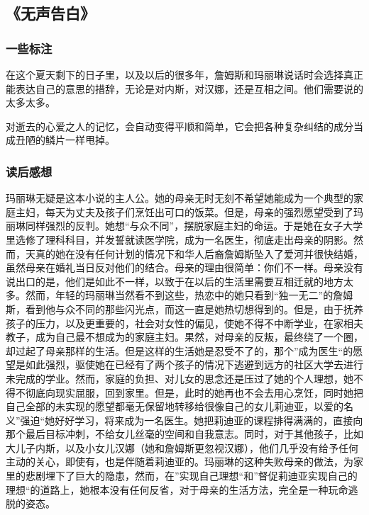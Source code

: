 \subsection{《无声告白》}

\subsubsection{一些标注}
在这个夏天剩下的日子里，以及以后的很多年，詹姆斯和玛丽琳说话时会选择真正能表达自己的意思的措辞，无论是对内斯，对汉娜，还是互相之间。他们需要说的太多太多。

对逝去的心爱之人的记忆，会自动变得平顺和简单，它会把各种复杂纠结的成分当成丑陋的鳞片一样甩掉。

\subsubsection{读后感想}
玛丽琳无疑是这本小说的主人公。她的母亲无时无刻不希望她能成为一个典型的家庭主妇，每天为丈夫及孩子们烹饪出可口的饭菜。但是，母亲的强烈愿望受到了玛丽琳同样强烈的反判。她想“与众不同”，摆脱家庭主妇的命运。于是她在女子大学里选修了理科科目，并发誓就读医学院，成为一名医生，彻底走出母亲的阴影。然而，天真的她在没有任何计划的情况下和华人后裔詹姆斯坠入了爱河并很快结婚，虽然母亲在婚礼当日反对他们的结合。母亲的理由很简单：你们不一样。母亲没有说出口的是，他们是如此不一样，以致于在以后的生活里需要互相迁就的地方太多。然而，年轻的玛丽琳当然看不到这些，热恋中的她只看到“独一无二”的詹姆斯，看到他与众不同的那些闪光点，而这一直是她热切想得到的。但是，由于抚养孩子的压力，以及更重要的，社会对女性的偏见，使她不得不中断学业，在家相夫教子，成为自己最不想成为的家庭主妇。果然，对母亲的反叛，最终绕了一个圈，却过起了母亲那样的生活。但是这样的生活她是忍受不了的，那个”成为医生“的愿望是如此强烈，驱使她在已经有了两个孩子的情况下逃避到远方的社区大学去进行未完成的学业。然而，家庭的负担、对儿女的思念还是压过了她的个人理想，她不得不彻底向现实屈服，回到家里。但是，此时的她再也不会去用心烹饪，同时她把自己全部的未实现的愿望都毫无保留地转移给很像自己的女儿莉迪亚，以爱的名义”强迫“她好好学习，将来成为一名医生。她把莉迪亚的课程排得满满的，直接向那个最后目标冲刺，不给女儿丝毫的空间和自我意志。同时，对于其他孩子，比如大儿子内斯，以及小女儿汉娜（她和詹姆斯更忽视汉娜），他们几乎没有给予任何主动的关心，即使有，也是伴随着莉迪亚的。玛丽琳的这种失败母亲的做法，为家里的悲剧埋下了巨大的隐患，然而，在”实现自己理想“和”督促莉迪亚实现自己的理想“的道路上，她根本没有任何反省，对于母亲的生活方法，完全是一种玩命逃脱的姿态。


